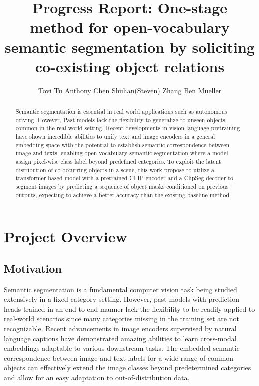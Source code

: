 \documentclass[10pt,twocolumn,letterpaper]{article}
\begin{document}
\title{Progress Report: One-stage method for open-vocabulary semantic segmentation by soliciting co-existing object relations}

\author{
Tovi Tu \hspace{1in} Anthony Chen \hspace{1in} Shuhan(Steven) Zhang  \hspace{1in} Ben Mueller 
}
\maketitle

\begin{abstract}
  Semantic segmentation is essential in real world applications such as autonomous driving. However, Past models lack the flexibility to generalize to unseen objects common in the real-world setting. Recent developments in vision-language pretraining have shown incredible abilities to unify text and image encoders in a general embedding space with the potential to establish semantic correspondence between image and texts, enabling open-vocabulary semantic segmentation where a model assign pixel-wise class label beyond predefined categories. To exploit the latent distribution of co-occurring objects in a scene, this work propose to utilize a transformer-based model with a pretrained CLIP encoder and a ClipSeg decoder to segment images by predicting a sequence of object masks conditioned on previous outputs, expecting to achieve a better accuracy than the existing baseline method.
\end{abstract}


\section{Project Overview}

\subsection{Motivation}

Semantic segmentation is a fundamental computer vision task being studied extensively in a fixed-category setting. However, past models with prediction heads trained in an end-to-end manner lack the flexibility to be readily applied to real-world scenarios since many categories missing in the training set are not recognizable. Recent advancements in image encoders supervised by natural language captions have demonstrated amazing abilities to learn cross-modal embeddings adaptable to various downstream tasks. The embedded semantic correspondence between image and text labels for a wide range of common objects can effectively extend the image classes beyond predetermined categories and allow for an easy adaptation to out-of-distribution data. 
\end{document}
